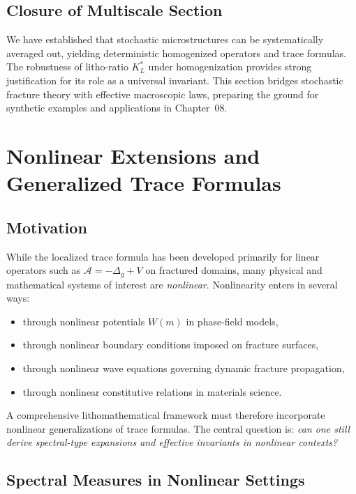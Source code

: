 \subsection*{Closure of Multiscale Section}

We have established that stochastic microstructures can be systematically averaged out, yielding deterministic homogenized operators and trace formulas.  
The robustness of litho-ratio $K_L^*$ under homogenization provides strong justification for its role as a universal invariant.  
This section bridges stochastic fracture theory with effective macroscopic laws, preparing the ground for synthetic examples and applications in Chapter~08.

\section{Nonlinear Extensions and Generalized Trace Formulas}
\label{sec:nonlinear-trace}

\subsection{Motivation}

While the localized trace formula has been developed primarily for
linear operators such as $\mathcal{A} = -\Delta_g + V$ on fractured
domains, many physical and mathematical systems of interest are
\emph{nonlinear}. Nonlinearity enters in several ways:

\begin{itemize}
  \item through nonlinear potentials $W(m)$ in phase-field models,
  \item through nonlinear boundary conditions imposed on fracture surfaces,
  \item through nonlinear wave equations governing dynamic fracture propagation,
  \item through nonlinear constitutive relations in materials science.
\end{itemize}

A comprehensive lithomathematical framework must therefore incorporate
nonlinear generalizations of trace formulas. The central question is:
\emph{can one still derive spectral-type expansions and effective invariants in nonlinear contexts?}

\subsection{Spectral Measures in Nonlinear Settings}

